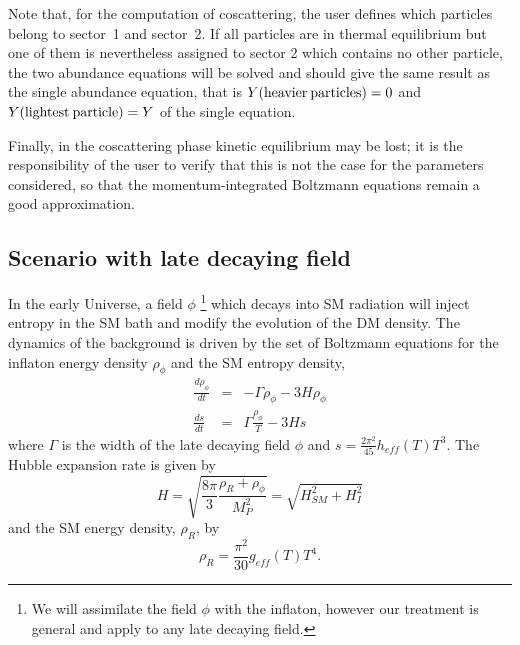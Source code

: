 \documentclass[12pt,a4paper]{article}
\begin{document}
 Note  that, for the computation of coscattering, the user defines which particles belong to sector~1 and sector~2.
If all particles are  in thermal equilibrium but one of them is nevertheless assigned to sector 2 which contains no other particle, the two abundance equations will be solved and should give the same result as the single abundance equation, that is $Y{\rm(heavier\:particles)}=0$ and $Y{\rm (lightest\:particle)}=Y$ of the single equation. 

Finally, in the coscattering phase kinetic equilibrium may be lost; 
it is the responsibility of the user to verify that this is not the case for the parameters considered, so that 
the momentum-integrated Boltzmann equations remain a good approximation. \\


\subsection{Scenario   with late decaying field}
\label{sec:slowInflaton}
In the early Universe,  a field $\phi$ \footnote{We will assimilate the field $\phi$ with the inflaton, however our treatment is general and apply to any late decaying field.}
which decays into SM radiation will inject entropy in the SM bath and modify the evolution of the DM density. 
 The dynamics of the background is driven by the set of Boltzmann equations
for the inflaton energy density $\rho_\phi$ and the SM entropy density,~\cite{Gelmini:2006pw}
\begin{eqnarray}
\label{Infl_evol_rho}
  \frac{d\rho_\phi}{dt}&=& -\Gamma \rho_\phi -3H\rho_\phi\\
\label{Infl_evol_s}
   \frac{ds}{dt}&=&\Gamma\frac{\rho_\phi}{T} -3Hs
    \end{eqnarray}
 where  $\Gamma$ is the width of the late decaying field $\phi$ and $s=\frac{2\pi^2}{45}h_{eff}(T)T^3$.
 The Hubble expansion rate is given by 
 \begin{equation}
   H=\sqrt{\frac{8\pi}{3} \frac{ \rho_R+\rho_\phi }{M_P^2}} = \sqrt{H_{SM}^2+H_I^2}
   \label{eq:H}
   \end{equation}
   and the SM energy density, $\rho_R$, by
\begin{equation}   \rho_R=\frac{\pi^2}{30}g_{eff}(T) T^4.
\end{equation}
\end{document}
